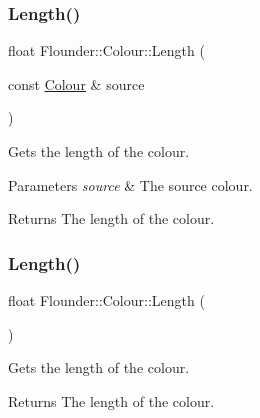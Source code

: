 \subsubsection{\texorpdfstring{Length()}{Length()}\hspace{0.1cm}{\footnotesize\ttfamily [1/2]}}
{\footnotesize\ttfamily float Flounder\+::\+Colour\+::\+Length (\begin{DoxyParamCaption}\item[{const \hyperlink{class_flounder_1_1_colour}{Colour} \&}]{source }\end{DoxyParamCaption})\hspace{0.3cm}{\ttfamily [static]}}



Gets the length of the colour. 


\begin{DoxyParams}{Parameters}
{\em source} & The source colour. \\
\hline
\end{DoxyParams}
\begin{DoxyReturn}{Returns}
The length of the colour. 
\end{DoxyReturn}
\mbox{\label{class_flounder_1_1_colour_a42c4eb61e3eb6b9ae29fde11e4428f9d}} 
\subsubsection{\texorpdfstring{Length()}{Length()}\hspace{0.1cm}{\footnotesize\ttfamily [2/2]}}
{\footnotesize\ttfamily float Flounder\+::\+Colour\+::\+Length (\begin{DoxyParamCaption}{ }\end{DoxyParamCaption})}



Gets the length of the colour. 

\begin{DoxyReturn}{Returns}
The length of the colour. 
\end{DoxyReturn}
\mbox{\label{class_flounder_1_1_colour_a5f016f570b13c76c3ac6f4b0ccc901d2}} 
